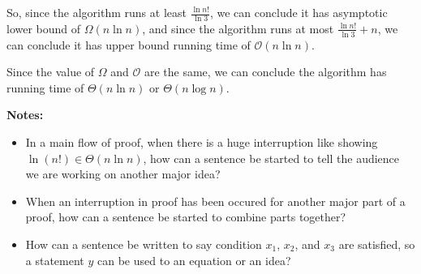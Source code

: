 \documentclass[12pt]{article}
\begin{document}
\begin{enumerate}[a.]
\begin{mdframed}
        \bigskip

        So, since the algorithm runs at least $\frac{\ln n!}{\ln 3}$, we can
        conclude it has asymptotic lower bound of $\Omega(n \ln n)$, and since
        the algorithm runs at most $\frac{\ln n!}{\ln 3} + n$, we can conclude it
        has upper bound running time of $\mathcal{O}(n\ln n)$.

        \bigskip

        Since the value of $\Omega$ and $\mathcal{O}$ are the same, we can conclude
        the algorithm has running time of $\Theta(n \ln n)$ or $\Theta(n \log n)$.
        \color{black}

    \end{mdframed}

    \bigskip

    \textbf{Notes:}

    \begin{itemize}
        \item In a main flow of proof, when there is a huge interruption like
        showing $\ln(n!) \in \Theta(n\ln n)$, how can a sentence be started to tell
        the audience we are working on another major idea?

        \item When an interruption in proof has been occured for another
        major part of a proof, how can a sentence be started to combine
        parts together?

        \item How can a sentence be written to say condition $x_1$, $x_2$, and $x_3$
        are satisfied, so a statement $y$ can be used to an equation or an idea?

    \end{itemize}
\end{enumerate}
\end{document}
